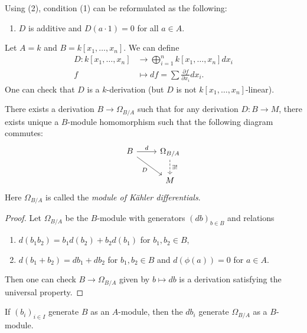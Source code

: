 \begin{remark}
  Using (2), condition
  (1) can be reformulated as
  the following:
  \begin{enumerate}
    \item[1'.] $D$ is additive and
      $D(a \cdot 1) = 0$ for all $a \in A$.
  \end{enumerate}
\end{remark}

\begin{example}
  Let $A = k$ and $B = k[x_1, \dots, x_n]$.
  We can define
  \begin{align*}
    D : k[x_1, \dots, x_n]
    &\longrightarrow \bigoplus_{i = 1}^n k[x_1, \dots, x_n] dx_i \\
    f &\longmapsto df = \sum \frac{\partial f}{\partial x_i} dx_i.
  \end{align*}
  One can check that $D$ is a $k$-derivation
  (but $D$ is not $k[x_1, \dots, x_n]$-linear).
\end{example}

\begin{prop}
  There exists a derivation
  $B \to \Omega_{B / A}$ such that for
  any derivation $D : B \to M$, there exists
  unique a $B$-module homomorphism such that
  the following diagram commutes:
  \[
    \begin{tikzcd}
      B \ar[r, "d"] \ar[dr, "D", swap]
      & \Omega_{B / A} \ar[d, dashed, "\exists !"] \\
      & M
    \end{tikzcd}
  \]
  Here $\Omega_{B / A}$ is called the
  \emph{module of K\"ahler differentials}.
\end{prop}

\begin{proof}
  Let $\Omega_{B / A}$ be the $B$-module
  with generators $(db)_{b \in B}$
  and relations
  \begin{enumerate}
    \item $d(b_1 b_2) = b_1 d(b_2) + b_2 d(b_1)$ for $b_1, b_2 \in B$,
    \item $d(b_1 + b_2) = db_1 + db_2$
      for $b_1, b_2 \in B$
      and $d(\phi(a)) = 0$ for $a \in A$.
  \end{enumerate}
  Then one can check
  $B \to \Omega_{B / A}$ given by
  $b \mapsto db$ is a derivation
  satisfying the universal property.
\end{proof}

\begin{remark}
  If $(b_i)_{i \in I}$ generate $B$
  as an $A$-module, then the $db_i$
  generate $\Omega_{B / A}$ as a $B$-module.
\end{remark}

